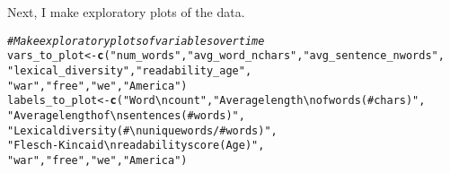 \documentclass{article}\usepackage[]{graphicx}\usepackage[]{color}
\makeatletter
\newcommand{\hlstr}[1]{\textcolor[rgb]{0.192,0.494,0.8}{#1}}%
\newcommand{\hlcom}[1]{\textcolor[rgb]{0.678,0.584,0.686}{\textit{#1}}}%
\newcommand{\hlstd}[1]{\textcolor[rgb]{0.345,0.345,0.345}{#1}}%
\newcommand{\hlkwb}[1]{\textcolor[rgb]{0.69,0.353,0.396}{#1}}%
\newcommand{\hlkwd}[1]{\textcolor[rgb]{0.737,0.353,0.396}{\textbf{#1}}}%
\newenvironment{kframe}{%
 \def\at@end@of@kframe{}%
 \ifinner\ifhmode%
  \def\at@end@of@kframe{\end{minipage}}%
  \begin{minipage}{\columnwidth}%
 \fi\fi%
 \def\FrameCommand##1{\hskip\@totalleftmargin \hskip-\fboxsep
 \colorbox{shadecolor}{##1}\hskip-\fboxsep
     \hskip-\linewidth \hskip-\@totalleftmargin \hskip\columnwidth}%
 \MakeFramed {\advance\hsize-\width
   \@totalleftmargin\z@ \linewidth\hsize
   \@setminipage}}%
 {\par\unskip\endMakeFramed%
 \at@end@of@kframe}
\newenvironment{knitrout}{}{} %
\makeatother
\begin{document}
Next, I make exploratory plots of the data.
\begin{knitrout}
\color{fgcolor}\begin{kframe}
\begin{alltt}
 \hlcom{# Make exploratory plots of variables over time}
 \hlstd{vars_to_plot} \hlkwb{<-} \hlkwd{c}\hlstd{(}\hlstr{"num_words"}\hlstd{,} \hlstr{"avg_word_nchars"}\hlstd{,} \hlstr{"avg_sentence_nwords"}\hlstd{,}
                   \hlstr{"lexical_diversity"}\hlstd{,} \hlstr{"readability_age"}\hlstd{,}
                   \hlstr{"war"}\hlstd{,} \hlstr{"free"}\hlstd{,} \hlstr{"we"}\hlstd{,} \hlstr{"America"}\hlstd{)}
 \hlstd{labels_to_plot} \hlkwb{<-} \hlkwd{c}\hlstd{(}\hlstr{"Word\textbackslash{}ncount"}\hlstd{,} \hlstr{"Average length\textbackslash{}nof words (# chars)"}\hlstd{,}
                     \hlstr{"Average length of\textbackslash{}nsentences (# words)"}\hlstd{,}
                     \hlstr{"Lexical diversity (#\textbackslash{}nunique words/# words)"}\hlstd{,}
                     \hlstr{"Flesch-Kincaid\textbackslash{}nreadability score (Age)"}\hlstd{,}
                     \hlstr{"war"}\hlstd{,} \hlstr{"free"}\hlstd{,} \hlstr{"we"}\hlstd{,} \hlstr{"America"}\hlstd{)}


\end{alltt}
\end{kframe}
\end{knitrout}
\end{document}
